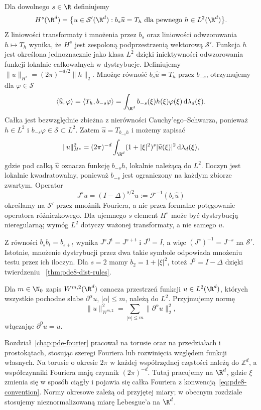 \begin{definicja}
\label{def:pde8-Hs}
Dla dowolnego $s\in\R$ definiujemy
\[
 H^s(\R^d)=\bigl\{u\in\mathcal S'(\R^d):
 b_s\widehat u=T_h\text{ dla pewnego }
 h\in L^2(\R^d)\bigr\}.
\]
Z liniowości transformaty i mnożenia przez $b_s$
oraz liniowości odwzorowania $h\mapsto T_h$
wynika, że $H^s$ jest zespoloną podprzestrzenią
wektorową $\mathcal S'$.
Funkcja $h$ jest określona jednoznacznie jako
klasa $L^2$ dzięki iniektywności odwzorowania
funkcji lokalnie całkowalnych w dystrybucje.
Definiujemy
$\|u\|_{H^s}=(2\pi)^{-d/2}\|h\|_2$.
Mnożąc równość $b_s\widehat u=T_h$ przez
$b_{-s}$, otrzymujemy dla $\varphi\in\mathcal S$
\[
 \langle\widehat u,\varphi\rangle
 =\langle T_h,b_{-s}\varphi\rangle
 =\int_{\R^d}b_{-s}(\xi)h(\xi)\varphi(\xi)
 \,\mathrm d\lambda_d(\xi).
\]
Całka jest bezwzględnie zbieżna z nierówności
Cauchy'ego--Schwarza, ponieważ $h\in L^2$
i $b_{-s}\varphi\in\mathcal S\subset L^2$.
Zatem $\widehat u=T_{b_{-s}h}$ i możemy zapisać
\[
 \|u\|_{H^s}^2=(2\pi)^{-d}\int_{\R^d}
 (1+|\xi|^2)^s|\widehat u(\xi)|^2\,
 \mathrm d\lambda_d(\xi),
\]
gdzie pod całką $\widehat u$ oznacza funkcję
$b_{-s}h$, lokalnie należącą do $L^2$.
Iloczyn jest lokalnie kwadratowalny, ponieważ
$b_{-s}$ jest ograniczony na każdym zbiorze zwartym.
Operator
\[
 J^s u=(I-\Delta)^{s/2}u
 :=\mathcal F^{-1}(b_s\widehat u)
\]
określamy na $\mathcal S'$ przez mnożnik Fouriera,
a nie przez formalne potęgowanie operatora
różniczkowego.
Dla ujemnego $s$ element $H^s$ może być
dystrybucją nieregularną; wymóg $L^2$ dotyczy
ważonej transformaty, a nie samego $u$.
\end{definicja}

Z równości $b_sb_t=b_{s+t}$ wynika
$J^sJ^t=J^{s+t}$ i $J^0=I$, a więc
$(J^s)^{-1}=J^{-s}$ na $\mathcal S'$.
Istotnie, mnożenie dystrybucji przez dwa takie
symbole odpowiada mnożeniu testu przez ich iloczyn.
Dla $s=2$ mamy $b_2=1+|\xi|^2$, toteż
$J^2=I-\Delta$ dzięki twierdzeniu
~\ref{thm:pde8-dist-rules}.

Dla $m\in\N_0$ zapis $W^{m,2}(\R^d)$ oznacza
przestrzeń funkcji $u\in L^2(\R^d)$, których
wszystkie pochodne słabe $\partial^\alpha u$,
$|\alpha|\le m$, należą do $L^2$.
Przyjmujemy normę
\[
 \|u\|_{W^{m,2}}^2=\sum_{|\alpha|\le m}
 \|\partial^\alpha u\|_2^2,
\]
włączając $\partial^0u=u$.

\begin{uwaga}
Rozdział~\ref{chap:pde-fourier} pracował na torusie
oraz na przedziałach i prostokątach, stosując
szeregi Fouriera lub rozwinięcia względem
funkcji własnych. Na torusie o okresie $2\pi$
w każdej współrzędnej częstości należą do $\mathbb Z^d$,
a współczynniki Fouriera mają czynnik $(2\pi)^{-d}$.
Tutaj pracujemy na $\R^d$, gdzie $\xi$ zmienia
się w sposób ciągły i pojawia się całka Fouriera
z konwencją~\eqref{eq:pde8-convention}.
Normy okresowe zależą od przyjętej miary;
w obecnym rozdziale stosujemy nieznormalizowaną
miarę Lebesgue'a na $\R^d$.
\end{uwaga}

